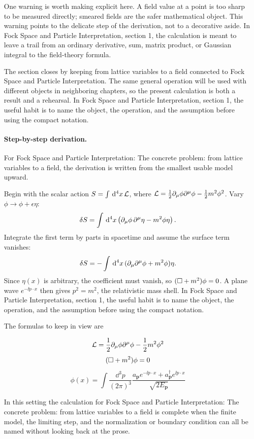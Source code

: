 One warning is worth making explicit here.  A field value at a point is too sharp to be measured directly; smeared fields are the safer mathematical object.  This warning points to the delicate step of the derivation, not to a decorative aside.  In Fock Space and Particle Interpretation, section 1, the calculation is meant to leave a trail from an ordinary derivative, sum, matrix product, or Gaussian integral to the field-theory formula.

The section closes by keeping from lattice variables to a field connected to Fock Space and Particle Interpretation.  The same general operation will be used with different objects in neighboring chapters, so the present calculation is both a result and a rehearsal.  In Fock Space and Particle Interpretation, section 1, the useful habit is to name the object, the operation, and the assumption before using the compact notation.



\paragraph{Step-by-step derivation.}

For Fock Space and Particle Interpretation: The concrete problem: from lattice variables to a field, the derivation is written from the smallest usable model upward.

Begin with the scalar action \(S=\int\,\mathrm d^4x\,\mathcal L\), where \(\mathcal L=\frac12\partial_\mu\phi\partial^\mu\phi-\frac12m^2\phi^2\).  Vary \(\phi\to\phi+\epsilon\eta\):
\[
  \delta S=\int\,\mathrm d^4x\left(\partial_\mu\phi\,\partial^\mu\eta-m^2\phi\eta\right).
\]
Integrate the first term by parts in spacetime and assume the surface term vanishes:
\[
  \delta S=-\int\,\mathrm d^4x\,(\partial_\mu\partial^\mu\phi+m^2\phi)\eta.
\]
Since \(\eta(x)\) is arbitrary, the coefficient must vanish, so \((\Box+m^2)\phi=0\).  A plane wave \(e^{-\ii p\cdot x}\) then gives \(p^2=m^2\), the relativistic mass shell.  In Fock Space and Particle Interpretation, section 1, the useful habit is to name the object, the operation, and the assumption before using the compact notation.

The formulas to keep in view are

\[
  \mathcal L=\frac12\partial_\mu\phi\partial^\mu\phi-\frac12m^2\phi^2
\]
\[
  (\Box+m^2)\phi=0
\]
\[
  \phi(x)=\int\frac{\dd^3p}{(2\pi)^3}\frac{a_{\bm p}e^{-\ii p\cdot x}+a_{\bm p}^\dagger e^{\ii p\cdot x}}{\sqrt{2E_{\bm p}}}
\]

In this setting the calculation for Fock Space and Particle Interpretation: The concrete problem: from lattice variables to a field is complete when the finite model, the limiting step, and the normalization or boundary condition can all be named without looking back at the prose.




